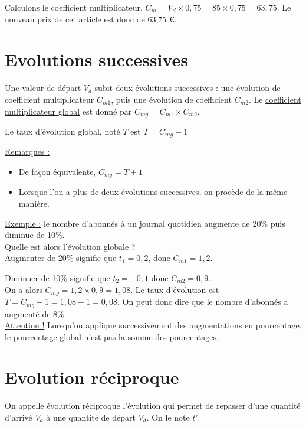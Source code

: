 \documentclass[french]{book}
\begin{document}
Calculons le coefficient multiplicateur. $C_m= V_d \times 0,75 = 85 \times 0,75 = 63,75$. Le nouveau prix de cet article est donc de 63,75 \euro{}.

\newpage

    \section{Evolutions successives} 



\begin{prop} Une valeur de départ $V_d$ subit deux évolutions successives : une évolution de coefficient multiplicateur $C_{m1}$, puis une évolution de coefficient $C_{m2}$.
Le \underline{coefficient multiplicateur global} est donné par $C_{mg}=C_{m1} \times C_{m2}$.
\end{prop}

\begin{defn}
Le taux d’évolution global, noté $T$ est $T=C_{mg}-1$
\vspace{5mm}
\end{defn}

\underline{Remarques :}
\begin{itemize}
 \item[$\bullet$] De façon équivalente, $C_{mg}=T+1$
 \item[$\bullet$] Lorsque l’on a plus de deux évolutions successives, on procède de la même manière.	
\end{itemize}

\underline{Exemple :} le nombre d’abonnés à un journal quotidien augmente de 20\% puis diminue de 10\%.  \\

Quelle est alors l’évolution globale ?\\

Augmenter de 20\% signifie que $t_1=0,2$, donc $C_{m1}=1,2$.

Diminuer de 10\% signifie que $t_2=-0,1$ donc $C_{m2}=0,9$.\\

On a alors $C_{mg} = 1,2 \times 0,9 = 1,08$. Le taux d’évolution est $T = C_{mg}-1 = 1,08-1 = 0,08$. On peut donc dire que le nombre d’abonnés a augmenté de 8\%. \\

\underline{Attention !} Lorsqu’on applique successivement des augmentations en pourcentage, le pourcentage global n’est pas la somme des pourcentages.

   \section{Evolution réciproque}
\begin{defn}
On appelle évolution réciproque l’évolution qui permet de repasser d’une quantité d’arrivé $V_a$ à une quantité de départ $V_d$. On le note $t’$.
\end{defn}
\end{document}
